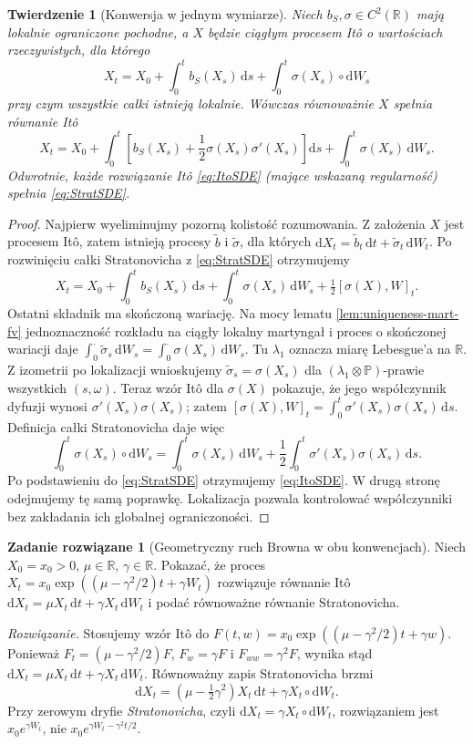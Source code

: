 \documentclass[11pt,a4paper,oneside]{report}
\numberwithin{equation}{chapter}
\theoremstyle{plain}
\newtheorem{twierdzenie}{Twierdzenie}[chapter]
\theoremstyle{definition}
\newtheorem{zadanie}{Zadanie rozwiązane}[chapter]
\theoremstyle{remark}
\newcommand{\R}{\mathbb{R}}
\newcommand{\Prob}{\mathbb{P}}
\newcommand{\dd}{\mathrm{d}}
\begin{document}
\begin{twierdzenie}[Konwersja w jednym wymiarze]\label{thm:volIII:04:04}
\label{th:ito-strat-conversion}
Niech $b_S,\sigma\in C^2(\R)$ mają lokalnie ograniczone
pochodne, a $X$ będzie ciągłym procesem Itô o
wartościach rzeczywistych, dla którego
\[
X_t=X_0+\int_0^tb_S(X_s)\,\dd s
+\int_0^t\sigma(X_s)\circ\dd W_s
\tag{4.8}\label{eq:StratSDE}
\]
przy czym wszystkie całki istnieją lokalnie.
Wówczas równoważnie $X$ spełnia równanie Itô
\[
X_t=X_0+\int_0^t
\left[b_S(X_s)+\frac12\sigma(X_s)\sigma'(X_s)\right]\dd s
+\int_0^t\sigma(X_s)\,\dd W_s.
\tag{4.9}\label{eq:ItoSDE}
\]
Odwrotnie, każde rozwiązanie Itô \eqref{eq:ItoSDE}
(mające wskazaną regularność) spełnia \eqref{eq:StratSDE}.
\end{twierdzenie}
\begin{proof}
Najpierw wyeliminujmy pozorną kolistość rozumowania.
Z założenia $X$ jest procesem Itô, zatem istnieją
procesy $\widetilde b$ i $\widetilde\sigma$, dla których
$\dd X_t=\widetilde b_t\,\dd t+
\widetilde\sigma_t\,\dd W_t$. Po rozwinięciu całki
Stratonovicha z \eqref{eq:StratSDE} otrzymujemy
\[
X_t=X_0+\int_0^t b_S(X_s)\,\dd s
+\int_0^t\sigma(X_s)\,\dd W_s
+\tfrac12[\sigma(X),W]_t.
\]
Ostatni składnik ma skończoną wariację. Na mocy lematu \ref{lem:uniqueness-mart-fv}
jednoznaczność rozkładu na ciągły lokalny martyngał
i proces o skończonej wariacji daje
$\int_0^{\cdot}\widetilde\sigma_s\,\dd W_s
=\int_0^{\cdot}\sigma(X_s)\,\dd W_s$.
Tu $\lambda_1$ oznacza miarę Lebesgue'a na $\R$.
Z izometrii po lokalizacji wnioskujemy
$\widetilde\sigma_s=\sigma(X_s)$ dla
$(\lambda_1\otimes\Prob)$-prawie wszystkich $(s,\omega)$.
Teraz wzór Itô dla $\sigma(X)$ pokazuje, że jego
współczynnik dyfuzji wynosi
$\sigma'(X_s)\sigma(X_s)$; zatem
$[\sigma(X),W]_t=\int_0^t\sigma'(X_s)\sigma(X_s)\,\dd s$.
Definicja całki Stratonovicha daje więc
\[
\int_0^t\sigma(X_s)\circ\dd W_s
=\int_0^t\sigma(X_s)\,\dd W_s
+\frac12\int_0^t\sigma'(X_s)\sigma(X_s)\,\dd s.
\]
Po podstawieniu do \eqref{eq:StratSDE} otrzymujemy
\eqref{eq:ItoSDE}. W drugą stronę odejmujemy tę samą
poprawkę. Lokalizacja pozwala kontrolować współczynniki
bez zakładania ich globalnej ograniczoności.
\end{proof}

\begin{zadanie}[Geometryczny ruch Browna w obu konwencjach]
Niech $X_0=x_0>0$, $\mu\in\R$, $\gamma\in\R$.
Pokazać, że proces
$X_t=x_0\exp((\mu-\gamma^2/2)t+\gamma W_t)$
rozwiązuje równanie Itô
$\dd X_t=\mu X_t\,\dd t+\gamma X_t\,\dd W_t$
i podać równoważne równanie Stratonovicha.

\emph{Rozwiązanie.} Stosujemy wzór Itô do
$F(t,w)=x_0\exp((\mu-\gamma^2/2)t+\gamma w)$.
Ponieważ $F_t=(\mu-\gamma^2/2)F$,
$F_w=\gamma F$ i $F_{ww}=\gamma^2F$, wynika stąd
$\dd X_t=\mu X_t\,\dd t+\gamma X_t\,\dd W_t$.
Równoważny zapis Stratonovicha brzmi
\[
\dd X_t=(\mu-\tfrac12\gamma^2)X_t\,\dd t
+\gamma X_t\circ\dd W_t.
\]
Przy zerowym dryfie \emph{Stratonovicha}, czyli
$\dd X_t=\gamma X_t\circ\dd W_t$, rozwiązaniem jest
$x_0e^{\gamma W_t}$, nie
$x_0e^{\gamma W_t-\gamma^2t/2}$.
\end{zadanie}
\end{document}
